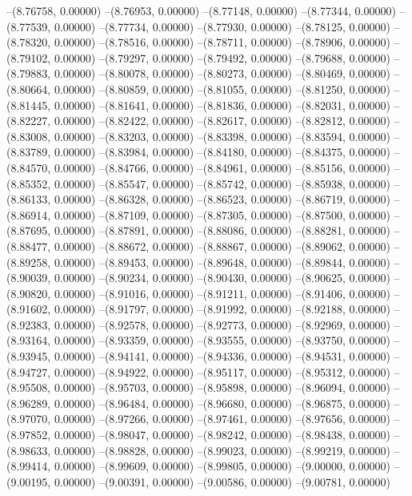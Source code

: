 --(8.76758, 0.00000)
--(8.76953, 0.00000)
--(8.77148, 0.00000)
--(8.77344, 0.00000)
--(8.77539, 0.00000)
--(8.77734, 0.00000)
--(8.77930, 0.00000)
--(8.78125, 0.00000)
--(8.78320, 0.00000)
--(8.78516, 0.00000)
--(8.78711, 0.00000)
--(8.78906, 0.00000)
--(8.79102, 0.00000)
--(8.79297, 0.00000)
--(8.79492, 0.00000)
--(8.79688, 0.00000)
--(8.79883, 0.00000)
--(8.80078, 0.00000)
--(8.80273, 0.00000)
--(8.80469, 0.00000)
--(8.80664, 0.00000)
--(8.80859, 0.00000)
--(8.81055, 0.00000)
--(8.81250, 0.00000)
--(8.81445, 0.00000)
--(8.81641, 0.00000)
--(8.81836, 0.00000)
--(8.82031, 0.00000)
--(8.82227, 0.00000)
--(8.82422, 0.00000)
--(8.82617, 0.00000)
--(8.82812, 0.00000)
--(8.83008, 0.00000)
--(8.83203, 0.00000)
--(8.83398, 0.00000)
--(8.83594, 0.00000)
--(8.83789, 0.00000)
--(8.83984, 0.00000)
--(8.84180, 0.00000)
--(8.84375, 0.00000)
--(8.84570, 0.00000)
--(8.84766, 0.00000)
--(8.84961, 0.00000)
--(8.85156, 0.00000)
--(8.85352, 0.00000)
--(8.85547, 0.00000)
--(8.85742, 0.00000)
--(8.85938, 0.00000)
--(8.86133, 0.00000)
--(8.86328, 0.00000)
--(8.86523, 0.00000)
--(8.86719, 0.00000)
--(8.86914, 0.00000)
--(8.87109, 0.00000)
--(8.87305, 0.00000)
--(8.87500, 0.00000)
--(8.87695, 0.00000)
--(8.87891, 0.00000)
--(8.88086, 0.00000)
--(8.88281, 0.00000)
--(8.88477, 0.00000)
--(8.88672, 0.00000)
--(8.88867, 0.00000)
--(8.89062, 0.00000)
--(8.89258, 0.00000)
--(8.89453, 0.00000)
--(8.89648, 0.00000)
--(8.89844, 0.00000)
--(8.90039, 0.00000)
--(8.90234, 0.00000)
--(8.90430, 0.00000)
--(8.90625, 0.00000)
--(8.90820, 0.00000)
--(8.91016, 0.00000)
--(8.91211, 0.00000)
--(8.91406, 0.00000)
--(8.91602, 0.00000)
--(8.91797, 0.00000)
--(8.91992, 0.00000)
--(8.92188, 0.00000)
--(8.92383, 0.00000)
--(8.92578, 0.00000)
--(8.92773, 0.00000)
--(8.92969, 0.00000)
--(8.93164, 0.00000)
--(8.93359, 0.00000)
--(8.93555, 0.00000)
--(8.93750, 0.00000)
--(8.93945, 0.00000)
--(8.94141, 0.00000)
--(8.94336, 0.00000)
--(8.94531, 0.00000)
--(8.94727, 0.00000)
--(8.94922, 0.00000)
--(8.95117, 0.00000)
--(8.95312, 0.00000)
--(8.95508, 0.00000)
--(8.95703, 0.00000)
--(8.95898, 0.00000)
--(8.96094, 0.00000)
--(8.96289, 0.00000)
--(8.96484, 0.00000)
--(8.96680, 0.00000)
--(8.96875, 0.00000)
--(8.97070, 0.00000)
--(8.97266, 0.00000)
--(8.97461, 0.00000)
--(8.97656, 0.00000)
--(8.97852, 0.00000)
--(8.98047, 0.00000)
--(8.98242, 0.00000)
--(8.98438, 0.00000)
--(8.98633, 0.00000)
--(8.98828, 0.00000)
--(8.99023, 0.00000)
--(8.99219, 0.00000)
--(8.99414, 0.00000)
--(8.99609, 0.00000)
--(8.99805, 0.00000)
--(9.00000, 0.00000)
--(9.00195, 0.00000)
--(9.00391, 0.00000)
--(9.00586, 0.00000)
--(9.00781, 0.00000)
